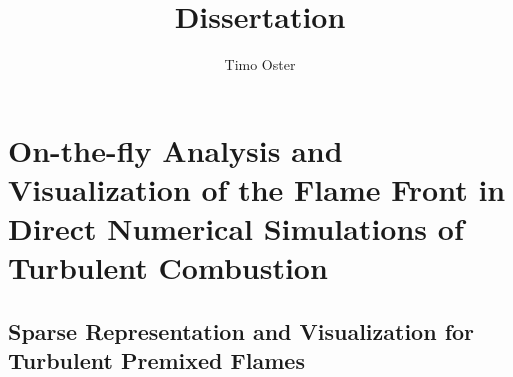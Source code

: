 \documentclass[BCOR=15mm, DIV=8]{scrbook}
\title{ Dissertation }
\author{ Timo Oster }
\begin{document}

\frontmatter

\maketitle

\tableofcontents

\mainmatter





\part[On-the-fly Analysis and Visualization of Turbulent Combustion Simulations]
        {On-the-fly Analysis and Visualization of the Flame Front
         in Direct Numerical Simulations of Turbulent Combustion} %
\label{part:on_the_fly}



\chapter[Sparse Representation for Turbulent Premixed Flames]{Sparse Representation and Visualization for Turbulent Premixed Flames} %
\label{cha:sparse_representation}
%
\tikzset{external/export=false}
\tikzset{external/export=true}
%







%
\end{document}
